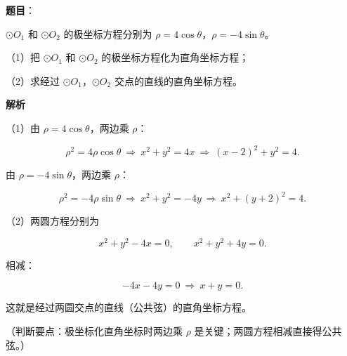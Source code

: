 \begin{answer}

\textbf{题目}：

$\odot O_1$ 和 $\odot O_2$ 的极坐标方程分别为 $\rho=4\cos\theta$，$\rho=-4\sin\theta$。

（1）把 $\odot O_1$ 和 $\odot O_2$ 的极坐标方程化为直角坐标方程；

（2）求经过 $\odot O_1$，$\odot O_2$ 交点的直线的直角坐标方程。

\textbf{解析}

（1）由 $\rho=4\cos\theta$，两边乘 $\rho$：

\nopagebreak[4]
\[\rho^2=4\rho\cos\theta\ \Rightarrow\ x^2+y^2=4x\ \Rightarrow\ (x-2)^2+y^2=4.\]

由 $\rho=-4\sin\theta$，两边乘 $\rho$：

\nopagebreak[4]
\[\rho^2=-4\rho\sin\theta\ \Rightarrow\ x^2+y^2=-4y\ \Rightarrow\ x^2+(y+2)^2=4.\]

（2）两圆方程分别为

\nopagebreak[4]
\[x^2+y^2-4x=0,\qquad x^2+y^2+4y=0.\]

相减：

\nopagebreak[4]
\[-4x-4y=0\ \Rightarrow\ x+y=0.\]

这就是经过两圆交点的直线（公共弦）的直角坐标方程。

（判断要点：极坐标化直角坐标时两边乘 $\rho$ 是关键；两圆方程相减直接得公共弦。）


\end{answer}
